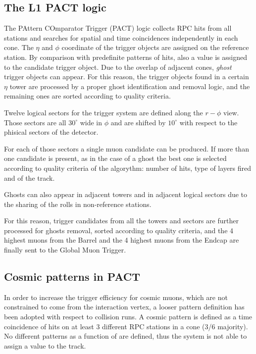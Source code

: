 \subsection{The L1 PACT logic}
The PAttern COmparator Trigger (PACT) logic 
collects RPC hits from all stations and searches for
spatial and time coincidences independently
in each cone. The $\eta$ and $\phi$ coordinate of the trigger
objects are assigned on the reference station.
By comparison with predefinite patterns of hits, 
also a \pt value is assigned to the candidate trigger 
object. Due to the overlap of adjacent cones, 
{\em ghost} trigger objects can appear. For this reason, 
the trigger objects found in a certain $\eta$ tower 
are processed by a proper ghost identification and removal logic,
and the remaining ones are sorted according to quality criteria.
 
Twelve logical sectors for the trigger system
are defined along the $r-\phi$ view. Those sectors are all
$30^\circ$ wide in $\phi$ and are shifted by 
$10^\circ$ with respect to the phisical sectors of the detector. %




For each of those sectors a single muon candidate can be produced.
If more than one candidate is present, as in the case of a ghost the best one is selected 
according to quality criteria of the algorythm: number of hits,
type of layers fired and \pt of the track.  

Ghosts can also appear in adjacent towers and in adjacent logical sectors
due to the sharing of the rolls in non-reference stations. 


For this reason, trigger candidates from all the towers and sectors
 are further processed for ghosts removal, sorted according to 
quality criteria, and the 4 highest \pt muons
from the Barrel and the 4 highest \pt muons from the 
Endcap are finally sent to the Global Muon Trigger.

\subsection{Cosmic patterns in PACT}
In order to increase the trigger efficiency for 
cosmic muons, which are not constrained
to come from the interaction vertex, 
a looser pattern definition has been 
adopted with respect to collision runs.
A cosmic pattern is defined as a 
time coincidence of hits on at least
3 different RPC stations in a cone (3/6 majority).
No different patterns as a function 
of \pt are defined, thus the system is
not able to assign a \pt value 
to the track.

